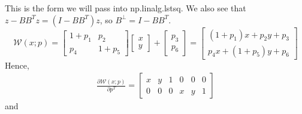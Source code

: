 \documentclass{scrbook}
\begin{document}
This is the form we will pass into np.linalg.lstsq. We also see that $z-BB^{T}z=\left(I-BB^{T}\right)z$, so $B^{\bot }=I-BB^{T}$.
\begin{equation*}
\mathcal{W}\left(x;p\right)=\left[\begin{array}{cc}
1+p_{1} & p_{2}\\
p_{4} & 1+p_{5}
\end{array}\right]\left[\begin{array}{c}
x\\
y
\end{array}\right]+\left[\begin{array}{c}
p_{3}\\
p_{6}
\end{array}\right]=\left[\begin{array}{c}
\left(1+p_{1}\right)x+p_{2}y+p_{3}\\
p_{4}x+\left(1+p_{5}\right)y+p_{6}
\end{array}\right]
\end{equation*}
Hence,
\begin{align*}
\frac{\partial \mathcal{W}\left(x;p\right)}{\partial p^{T}}=\begin{bmatrix}
x & y & 1 & 0 & 0 & 0\\
0 & 0 & 0 & x & y & 1
\end{bmatrix}
\end{align*}
and
\end{document}
